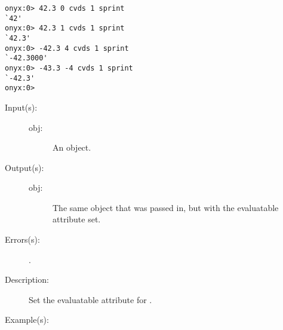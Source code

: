 \begin{description}
\begin{description}
\begin{verbatim}
onyx:0> 42.3 0 cvds 1 sprint
`42'
onyx:0> 42.3 1 cvds 1 sprint
`42.3'
onyx:0> -42.3 4 cvds 1 sprint
`-42.3000'
onyx:0> -43.3 -4 cvds 1 sprint
`-42.3'
onyx:0>
		\end{verbatim}
	\end{description}
\label{systemdict:cve}
\item[{\onyxop{obj}{cve}{obj}}: ]
	\begin{description}\item[]
	\item[Input(s): ]
		\begin{description}\item[]
		\item[obj: ]
			An object.
		\end{description}
	\item[Output(s): ]
		\begin{description}\item[]
		\item[obj: ]
			The same object that was passed in, but with the
			evaluatable attribute set.
		\end{description}
	\item[Errors(s): ]
		\begin{description}\item[]
		\item[.]
		\end{description}
	\item[Description: ]
		Set the evaluatable attribute for .
	\item[Example(s): ]\begin{verbatim}


\end{verbatim}
\end{description}
\end{description}
